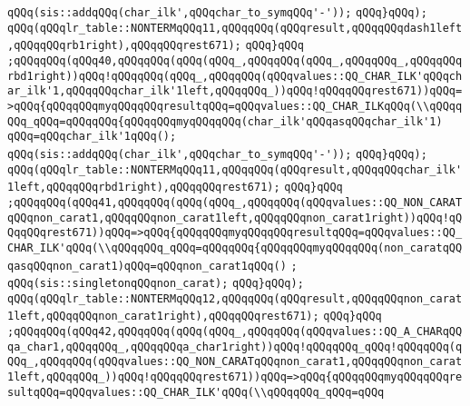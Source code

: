 \verb|qQQq(sis::addqQQq(char_ilk',qQQqchar_to_symqQQq'-'));|\newline
\verb|qQQq}qQQq);|\newline
\verb|qQQq(qQQqlr_table::NONTERMqQQq11,qQQqqQQq(qQQqresult,qQQqqQQqdash1left,qQQqqQQqrb1right),qQQqqQQqrest671);|\newline
\verb|qQQq}qQQq|\newline
\verb|;qQQqqQQq(qQQq40,qQQqqQQq(qQQq(qQQq_,qQQqqQQq(qQQq_,qQQqqQQq_,qQQqqQQqrbd1right))qQQq!qQQqqQQq(qQQq_,qQQqqQQq(qQQqvalues::QQ_CHAR_ILK'qQQqchar_ilk'1,qQQqqQQqchar_ilk'1left,qQQqqQQq_))qQQq!qQQqqQQqrest671))qQQq=>qQQq{qQQqqQQqmyqQQqqQQqresultqQQq=qQQqvalues::QQ_CHAR_ILKqQQq(\\qQQqqQQq_qQQq=qQQqqQQq{qQQqqQQqmyqQQqqQQq(char_ilk'qQQqasqQQqchar_ilk'1)|\newline
\verb|qQQq=qQQqchar_ilk'1qQQq();|\newline
\verb|qQQq(sis::addqQQq(char_ilk',qQQqchar_to_symqQQq'-'));|\newline
\verb|qQQq}qQQq);|\newline
\verb|qQQq(qQQqlr_table::NONTERMqQQq11,qQQqqQQq(qQQqresult,qQQqqQQqchar_ilk'1left,qQQqqQQqrbd1right),qQQqqQQqrest671);|\newline
\verb|qQQq}qQQq|\newline
\verb|;qQQqqQQq(qQQq41,qQQqqQQq(qQQq(qQQq_,qQQqqQQq(qQQqvalues::QQ_NON_CARATqQQqnon_carat1,qQQqqQQqnon_carat1left,qQQqqQQqnon_carat1right))qQQq!qQQqqQQqrest671))qQQq=>qQQq{qQQqqQQqmyqQQqqQQqresultqQQq=qQQqvalues::QQ_CHAR_ILK'qQQq(\\qQQqqQQq_qQQq=qQQqqQQq{qQQqqQQqmyqQQqqQQq(non_caratqQQqasqQQqnon_carat1)qQQq=qQQqnon_carat1qQQq()|\newline
\verb|;|\newline
\verb|qQQq(sis::singletonqQQqnon_carat);|\newline
\verb|qQQq}qQQq);|\newline
\verb|qQQq(qQQqlr_table::NONTERMqQQq12,qQQqqQQq(qQQqresult,qQQqqQQqnon_carat1left,qQQqqQQqnon_carat1right),qQQqqQQqrest671);|\newline
\verb|qQQq}qQQq|\newline
\verb|;qQQqqQQq(qQQq42,qQQqqQQq(qQQq(qQQq_,qQQqqQQq(qQQqvalues::QQ_A_CHARqQQqa_char1,qQQqqQQq_,qQQqqQQqa_char1right))qQQq!qQQqqQQq_qQQq!qQQqqQQq(qQQq_,qQQqqQQq(qQQqvalues::QQ_NON_CARATqQQqnon_carat1,qQQqqQQqnon_carat1left,qQQqqQQq_))qQQq!qQQqqQQqrest671))qQQq=>qQQq{qQQqqQQqmyqQQqqQQqresultqQQq=qQQqvalues::QQ_CHAR_ILK'qQQq(\\qQQqqQQq_qQQq=qQQq|\newline
